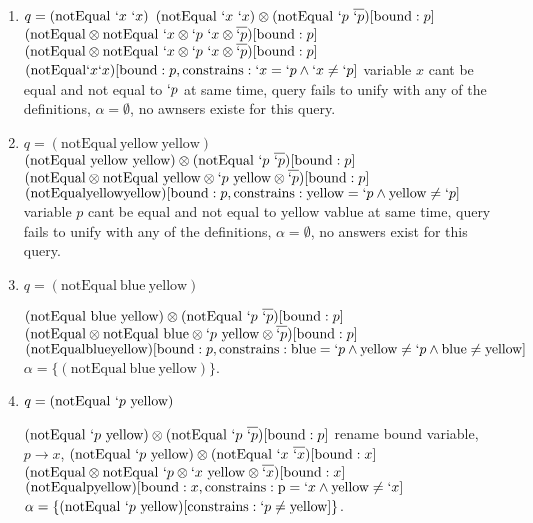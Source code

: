 \documentclass[11pt,a4paper]{report}
\newcommand{\var}[1]{`#1}
\newcommand{\unify}{\otimes}
\begin{document}
\begin{enumerate}
\item $q = (\text{notEqual}\ \var{x}\ \var{x})$
\subitem $(\text{notEqual}\ \var{x}\ \var{x}) \unify (\text{notEqual}\ \var{p}\ \overline{\var{p}})[\text{bound}: p]$
\subitem $(\text{notEqual} \unify \text{notEqual}\ \var{x} \unify \var{p}\ \var{x} \unify \overline{\var{p}})[\text{bound}: p]$ 
\subitem $(\text{notEqual} \unify \text{notEqual}\ \var{x} \unify \var{p}\ \var{x} \unify \overline{\var{p}})[\text{bound}: p]$ 
\subitem $(\text{notEqual} \var{x} \var{x})[\text{bound}: p, \text{constrains}: \var{x}=\var{p} \wedge \var{x} \neq \var{p}]$
\subitem variable $x$ cant be equal and not equal to $\var{p}$ at same time,
\subitem query fails to unify with any of the definitions,
\subitem $\alpha=\emptyset$, no awnsers existe for this query.

\item $q = (\text{notEqual}\  \text{yellow}\ \text{yellow})$
\subitem $(\text{notEqual}\ \text{yellow}\ \text{yellow}) \unify (\text{notEqual}\ \var{p}\ \overline{\var{p}})[\text{bound}: p]$
\subitem $(\text{notEqual} \unify \text{notEqual}\ \text{yellow} \unify \var{p}\ \text{yellow} \unify \overline{\var{p}})[\text{bound}: p]$ 
\subitem $(\text{notEqual} \text{yellow} \text{yellow})[\text{bound}: p, \text{constrains}: \text{yellow}=\var{p} \wedge \text{yellow} \neq \var{p}]$
\subitem variable $p$ cant be equal and not equal to $\text{yellow}$ vablue at same time,
\subitem query fails to unify with any of the definitions,
\subitem $\alpha=\emptyset$, no answers exist for this query.

\item $q = (\text{notEqual}\  \text{blue}\ \text{yellow})$

\subitem $(\text{notEqual}\ \text{blue}\ \text{yellow}) \unify (\text{notEqual}\ \var{p}\ \overline{\var{p}})[\text{bound}: p]$
\subitem $(\text{notEqual} \unify \text{notEqual}\ \text{blue} \unify \var{p}\ \text{yellow} \unify \overline{\var{p}})[\text{bound}: p]$ 
\subitem $(\text{notEqual} \text{blue} \text{yellow})[\text{bound}: p, \text{constrains}: \text{blue}=\var{p} \wedge \text{yellow} \neq \var{p} \wedge \text{blue} \neq \text{yellow}]$
\subitem $\alpha=\{(\text{notEqual}\  \text{blue}\ \text{yellow})\}$.

\item $q = (\text{notEqual}\ \var{p}\ \text{yellow})$

\subitem $(\text{notEqual}\ \var{p}\ \text{yellow}) \unify (\text{notEqual}\ \var{p}\ \overline{\var{p}})[\text{bound}: p]$
\subitem rename bound variable, $p \rightarrow x$, 
\subitem $(\text{notEqual}\ \var{p}\ \text{yellow}) \unify (\text{notEqual}\ \var{x}\ \overline{\var{x}})[\text{bound}: x]$
\subitem $(\text{notEqual} \unify \text{notEqual}\ \var{p} \unify \var{x}\ \text{yellow} \unify \overline{\var{x}})[\text{bound}: x]$ 
\subitem $(\text{notEqual} \text{p} \text{yellow})[\text{bound}: x, \text{constrains}: \text{p}=\var{x} \wedge \text{yellow} \neq \var{x}]$
\subitem $\alpha=\{(\text{notEqual}\  \var{p}\ \text{yellow})[\text{constrains}: \var{p} \neq \text{yellow}]\}$.

\end{enumerate}
\end{document}
